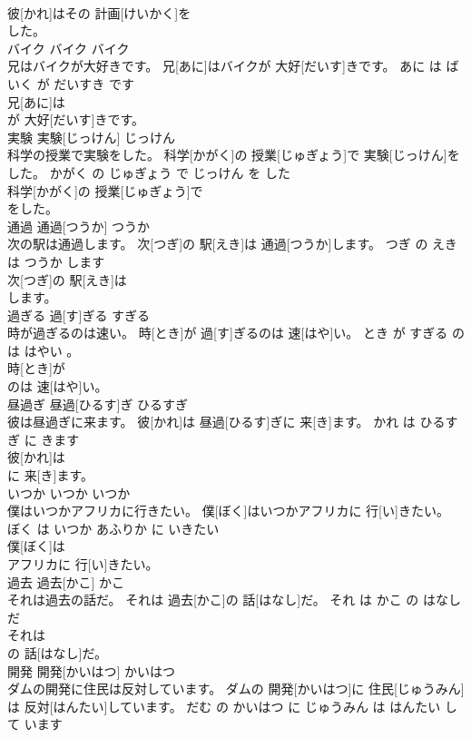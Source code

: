 \documentclass[8pt]{extreport}
\begin{document}
\begin{CJK}{UTF8}{min}
\\	彼[かれ]はその 計画[けいかく]を
\\	した。			
\\	バイク	バイク	バイク	
\\	兄はバイクが大好きです。	兄[あに]はバイクが 大好[だいす]きです。	あに は ばいく が だいすき です	
\\	兄[あに]は
\\	が 大好[だいす]きです。			
\\	実験	実験[じっけん]	じっけん	
\\	科学の授業で実験をした。	科学[かがく]の 授業[じゅぎょう]で 実験[じっけん]をした。	かがく の じゅぎょう で じっけん を した	
\\	科学[かがく]の 授業[じゅぎょう]で
\\	をした。			
\\	通過	通過[つうか]	つうか	
\\	次の駅は通過します。	次[つぎ]の 駅[えき]は 通過[つうか]します。	つぎ の えき は つうか します	
\\	次[つぎ]の 駅[えき]は
\\	します。			
\\	過ぎる	過[す]ぎる	すぎる	
\\	時が過ぎるのは速い。	時[とき]が 過[す]ぎるのは 速[はや]い。	とき が すぎる の は はやい 。	
\\	時[とき]が
\\	のは 速[はや]い。			
\\	昼過ぎ	昼過[ひるす]ぎ	ひるすぎ	
\\	彼は昼過ぎに来ます。	彼[かれ]は 昼過[ひるす]ぎに 来[き]ます。	かれ は ひるすぎ に きます	
\\	彼[かれ]は
\\	に 来[き]ます。			
\\	いつか	いつか	いつか	
\\	僕はいつかアフリカに行きたい。	僕[ぼく]はいつかアフリカに 行[い]きたい。	ぼく は いつか あふりか に いきたい	
\\	僕[ぼく]は
\\	アフリカに 行[い]きたい。			
\\	過去	過去[かこ]	かこ	
\\	それは過去の話だ。	それは 過去[かこ]の 話[はなし]だ。	それ は かこ の はなし だ	
\\	それは
\\	の 話[はなし]だ。			
\\	開発	開発[かいはつ]	かいはつ	
\\	ダムの開発に住民は反対しています。	ダムの 開発[かいはつ]に 住民[じゅうみん]は 反対[はんたい]しています。	だむ の かいはつ に じゅうみん は はんたい して います	

\end{CJK}
\end{document}
